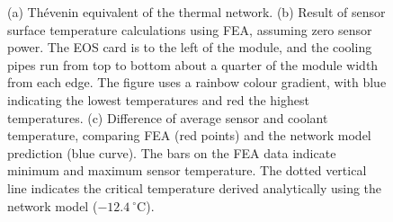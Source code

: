 \begin{figure}[ht]
\centering
{}\quad
{}\quad\quad
{}
\caption{(a) Th\'{e}venin equivalent of the thermal network. (b) Result of sensor surface temperature calculations using FEA, assuming zero sensor power. The EOS card is to the left of the module, and the cooling pipes run from top to bottom about a quarter of the module width from each edge. The figure uses a rainbow colour gradient, with blue indicating the lowest temperatures and red the highest temperatures. (c) Difference of average sensor and coolant temperature, comparing FEA (red points) and the network model prediction (blue curve). The bars on the FEA data indicate minimum and maximum sensor temperature. The dotted vertical line indicates the critical temperature derived analytically using the network model ($-12.4~^\circ$C).}
\label{fig:verification}
\end{figure}
